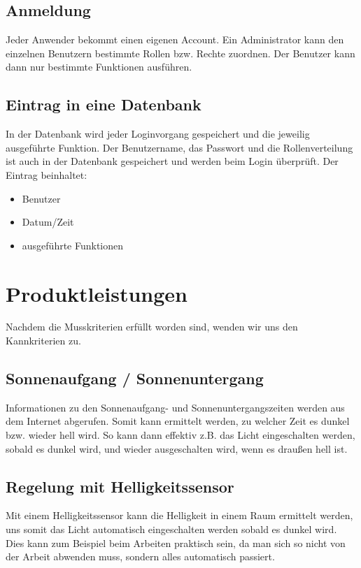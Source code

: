 \documentclass[10pt,a4paper]{report}
\begin{document}
\subsection{Anmeldung}
Jeder Anwender bekommt einen eigenen Account. Ein Administrator kann den einzelnen Benutzern bestimmte Rollen bzw. Rechte zuordnen. Der Benutzer kann dann nur bestimmte Funktionen ausführen.

\subsection{Eintrag in eine Datenbank}
In der Datenbank wird jeder Loginvorgang gespeichert und die jeweilig ausgeführte Funktion. 
Der Benutzername, das Passwort und die Rollenverteilung ist auch in der Datenbank gespeichert und werden beim Login überprüft.
Der Eintrag beinhaltet:
\begin{itemize}
\item Benutzer
\item Datum/Zeit
\item ausgeführte Funktionen
\end{itemize}

\section{Produktleistungen}
Nachdem die Musskriterien erfüllt worden sind, wenden wir uns den Kannkriterien zu.

\subsection{Sonnenaufgang / Sonnenuntergang}
Informationen zu den Sonnenaufgang- und Sonnenuntergangszeiten werden aus dem Internet abgerufen. Somit kann ermittelt werden, zu welcher Zeit es dunkel bzw. wieder hell wird. So kann dann effektiv z.B. das Licht eingeschalten werden, sobald es dunkel wird, und wieder ausgeschalten wird, wenn es draußen hell ist.

\subsection{Regelung mit Helligkeitssensor}
Mit einem Helligkeitssensor kann die Helligkeit in einem Raum ermittelt werden, uns somit das Licht automatisch eingeschalten werden sobald es dunkel wird. Dies kann zum Beispiel beim Arbeiten praktisch sein, da man sich so nicht von der Arbeit abwenden muss, sondern alles automatisch passiert.
\end{document}
